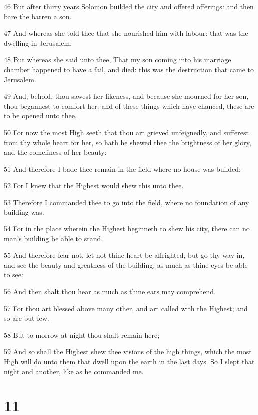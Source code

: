 \par 46 But after thirty years Solomon builded the city and offered offerings: and then bare the barren a son.
\par 47 And whereas she told thee that she nourished him with labour: that was the dwelling in Jerusalem.
\par 48 But whereas she said unto thee, That my son coming into his marriage chamber happened to have a fail, and died: this was the destruction that came to Jerusalem.
\par 49 And, behold, thou sawest her likeness, and because she mourned for her son, thou begannest to comfort her: and of these things which have chanced, these are to be opened unto thee.
\par 50 For now the most High seeth that thou art grieved unfeignedly, and sufferest from thy whole heart for her, so hath he shewed thee the brightness of her glory, and the comeliness of her beauty:
\par 51 And therefore I bade thee remain in the field where no house was builded:
\par 52 For I knew that the Highest would shew this unto thee.
\par 53 Therefore I commanded thee to go into the field, where no foundation of any building was.
\par 54 For in the place wherein the Highest beginneth to shew his city, there can no man's building be able to stand.
\par 55 And therefore fear not, let not thine heart be affrighted, but go thy way in, and see the beauty and greatness of the building, as much as thine eyes be able to see:
\par 56 And then shalt thou hear as much as thine ears may comprehend.
\par 57 For thou art blessed above many other, and art called with the Highest; and so are but few.
\par 58 But to morrow at night thou shalt remain here;
\par 59 And so shall the Highest shew thee visions of the high things, which the most High will do unto them that dwell upon the earth in the last days. So I slept that night and another, like as he commanded me.

\chapter{11}

